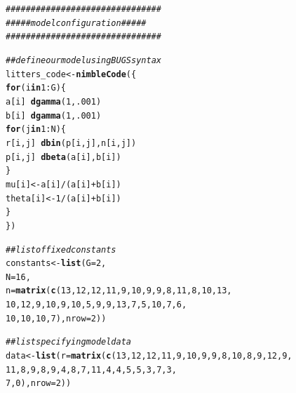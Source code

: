 \documentclass[12pt,oneside]{book}\usepackage[]{graphicx}\usepackage[]{color}
\makeatletter
\newcommand{\hlnum}[1]{\textcolor[rgb]{0.686,0.059,0.569}{#1}}%
\newcommand{\hlcom}[1]{\textcolor[rgb]{0.678,0.584,0.686}{\textit{#1}}}%
\newcommand{\hlopt}[1]{\textcolor[rgb]{0,0,0}{#1}}%
\newcommand{\hlstd}[1]{\textcolor[rgb]{0.345,0.345,0.345}{#1}}%
\newcommand{\hlkwa}[1]{\textcolor[rgb]{0.161,0.373,0.58}{\textbf{#1}}}%
\newcommand{\hlkwb}[1]{\textcolor[rgb]{0.69,0.353,0.396}{#1}}%
\newcommand{\hlkwc}[1]{\textcolor[rgb]{0.333,0.667,0.333}{#1}}%
\newcommand{\hlkwd}[1]{\textcolor[rgb]{0.737,0.353,0.396}{\textbf{#1}}}%
\newenvironment{kframe}{%
 \def\at@end@of@kframe{}%
 \ifinner\ifhmode%
  \def\at@end@of@kframe{\end{minipage}}%
  \begin{minipage}{\columnwidth}%
 \fi\fi%
 \def\FrameCommand##1{\hskip\@totalleftmargin \hskip-\fboxsep
 \colorbox{shadecolor}{##1}\hskip-\fboxsep
     \hskip-\linewidth \hskip-\@totalleftmargin \hskip\columnwidth}%
 \MakeFramed {\advance\hsize-\width
   \@totalleftmargin\z@ \linewidth\hsize
   \@setminipage}}%
 {\par\unskip\endMakeFramed%
 \at@end@of@kframe}
\newenvironment{knitrout}{}{} %
\makeatother
\begin{document}
\begin{knitrout}
\color{fgcolor}\begin{kframe}
\begin{alltt}
\hlcom{###############################}
\hlcom{##### model configuration #####}
\hlcom{###############################}

\hlcom{## define our model using BUGS syntax}
\hlstd{litters_code} \hlkwb{<-} \hlkwd{nimbleCode}\hlstd{(\{}
    \hlkwa{for} \hlstd{(i} \hlkwa{in} \hlnum{1}\hlopt{:}\hlstd{G) \{}
        \hlstd{a[i]} \hlopt{~} \hlkwd{dgamma}\hlstd{(}\hlnum{1}\hlstd{,} \hlnum{.001}\hlstd{)}
        \hlstd{b[i]} \hlopt{~} \hlkwd{dgamma}\hlstd{(}\hlnum{1}\hlstd{,} \hlnum{.001}\hlstd{)}
        \hlkwa{for} \hlstd{(j} \hlkwa{in} \hlnum{1}\hlopt{:}\hlstd{N) \{}
            \hlstd{r[i,j]} \hlopt{~} \hlkwd{dbin}\hlstd{(p[i,j], n[i,j])}
            \hlstd{p[i,j]} \hlopt{~} \hlkwd{dbeta}\hlstd{(a[i], b[i])}
        \hlstd{\}}
        \hlstd{mu[i]} \hlkwb{<-} \hlstd{a[i]} \hlopt{/} \hlstd{(a[i]} \hlopt{+} \hlstd{b[i])}
        \hlstd{theta[i]} \hlkwb{<-} \hlnum{1} \hlopt{/} \hlstd{(a[i]} \hlopt{+} \hlstd{b[i])}
    \hlstd{\}}
\hlstd{\})}

\hlcom{## list of fixed constants}
\hlstd{constants} \hlkwb{<-} \hlkwd{list}\hlstd{(}\hlkwc{G} \hlstd{=} \hlnum{2}\hlstd{,}
                  \hlkwc{N} \hlstd{=} \hlnum{16}\hlstd{,}
                  \hlkwc{n} \hlstd{=} \hlkwd{matrix}\hlstd{(}\hlkwd{c}\hlstd{(}\hlnum{13}\hlstd{,} \hlnum{12}\hlstd{,} \hlnum{12}\hlstd{,} \hlnum{11}\hlstd{,} \hlnum{9}\hlstd{,} \hlnum{10}\hlstd{,} \hlnum{9}\hlstd{,}  \hlnum{9}\hlstd{,} \hlnum{8}\hlstd{,} \hlnum{11}\hlstd{,} \hlnum{8}\hlstd{,} \hlnum{10}\hlstd{,} \hlnum{13}\hlstd{,}
                      \hlnum{10}\hlstd{,} \hlnum{12}\hlstd{,} \hlnum{9}\hlstd{,} \hlnum{10}\hlstd{,}  \hlnum{9}\hlstd{,} \hlnum{10}\hlstd{,} \hlnum{5}\hlstd{,}  \hlnum{9}\hlstd{,}  \hlnum{9}\hlstd{,} \hlnum{13}\hlstd{,} \hlnum{7}\hlstd{,} \hlnum{5}\hlstd{,} \hlnum{10}\hlstd{,} \hlnum{7}\hlstd{,}  \hlnum{6}\hlstd{,}
                      \hlnum{10}\hlstd{,} \hlnum{10}\hlstd{,} \hlnum{10}\hlstd{,} \hlnum{7}\hlstd{),} \hlkwc{nrow} \hlstd{=} \hlnum{2}\hlstd{))}

\hlcom{## list specifying model data}
\hlstd{data} \hlkwb{<-} \hlkwd{list}\hlstd{(}\hlkwc{r} \hlstd{=} \hlkwd{matrix}\hlstd{(}\hlkwd{c}\hlstd{(}\hlnum{13}\hlstd{,} \hlnum{12}\hlstd{,} \hlnum{12}\hlstd{,} \hlnum{11}\hlstd{,} \hlnum{9}\hlstd{,} \hlnum{10}\hlstd{,}  \hlnum{9}\hlstd{,} \hlnum{9}\hlstd{,} \hlnum{8}\hlstd{,} \hlnum{10}\hlstd{,} \hlnum{8}\hlstd{,} \hlnum{9}\hlstd{,} \hlnum{12}\hlstd{,} \hlnum{9}\hlstd{,}
                 \hlnum{11}\hlstd{,} \hlnum{8}\hlstd{,} \hlnum{9}\hlstd{,}  \hlnum{8}\hlstd{,}  \hlnum{9}\hlstd{,}  \hlnum{4}\hlstd{,} \hlnum{8}\hlstd{,}  \hlnum{7}\hlstd{,} \hlnum{11}\hlstd{,} \hlnum{4}\hlstd{,} \hlnum{4}\hlstd{,} \hlnum{5} \hlstd{,} \hlnum{5}\hlstd{,} \hlnum{3}\hlstd{,}  \hlnum{7}\hlstd{,} \hlnum{3}\hlstd{,}
                 \hlnum{7}\hlstd{,} \hlnum{0}\hlstd{),} \hlkwc{nrow} \hlstd{=} \hlnum{2}\hlstd{))}


\end{alltt}
\end{kframe}
\end{knitrout}
\end{document}
